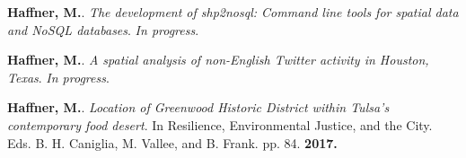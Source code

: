 

\begin{cventries}
   \cventry
      {}
      {}
      {}
      {}
      {
        \begin{cvitems}
          \vspace{-4mm}
        \item {\textbf{Haffner, M.}.
            \textit{The development of shp2nosql: Command line tools for spatial data and NoSQL databases}. \textit{In progress}.} \\
          \vspace{-2mm}
        \item
          {\textbf{Haffner, M.}.
            \textit{A spatial analysis of non-English Twitter activity in Houston, Texas}. \textit{In progress}.} \\
          \vspace{-2mm}
        \end{cvitems}
    }
\end{cventries}



\begin{cventries}
   \cventry
      {}
      {}
      {}
      {}
      {
        \begin{cvitems}
          \vspace{-4mm}
        \item {\textbf{Haffner, M.}.
            \textit{Location of Greenwood Historic District within Tulsa's
              contemporary food desert}. In Resilience, Environmental
              Justice, and the City. Eds. B. H. Caniglia, M. Vallee, and B.
            Frank. pp. 84. \textbf{2017.}} \\
          \vspace{-2mm}
        \end{cvitems}
    }
\end{cventries}